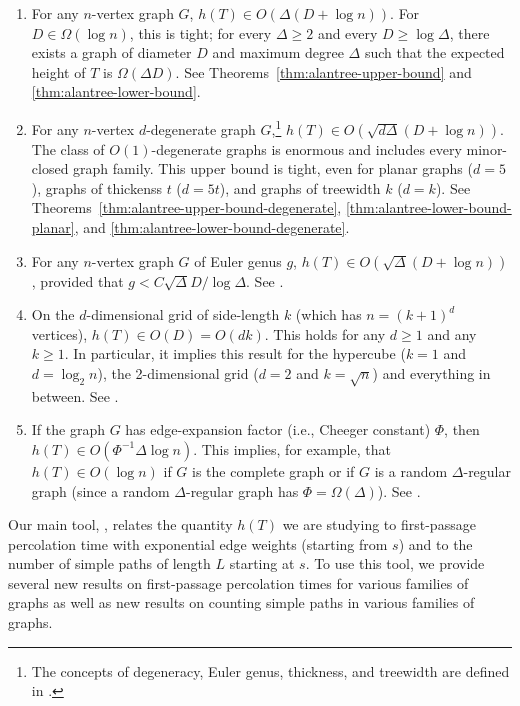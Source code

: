 \documentclass[lotsofwhite]{patmorin}
\begin{document}
\begin{enumerate}
  \item For any $n$-vertex graph $G$, $h(T)\in O(\Delta(D+\log n))$.
  For $D\in \Omega(\log n)$, this is tight; for every $\Delta\ge 2$
  and every $D \ge \log\Delta$, there exists a graph of diameter $D$
  and maximum degree $\Delta$ such that the expected height of $T$
  is $\Omega(\Delta D)$.  See Theorems~\ref{thm:alantree-upper-bound}
  and \ref{thm:alantree-lower-bound}.

  \item For any $n$-vertex $d$-degenerate graph $G$,\footnote{The
  concepts of degeneracy, Euler genus, thickness, and treewidth
  are defined in .} $h(T)\in
  O(\sqrt{d\Delta}(D+\log n))$.  The class of $O(1)$-degenerate
  graphs is enormous and includes every minor-closed graph family.
  This upper bound is tight, even for planar graphs ($d=5$), graphs
  of thickenss $t$ ($d=5t$), and graphs of treewidth $k$ ($d=k$).
  See Theorems~\ref{thm:alantree-upper-bound-degenerate},
  \ref{thm:alantree-lower-bound-planar}, and
  \ref{thm:alantree-lower-bound-degenerate}.

  \item For any $n$-vertex graph $G$ of Euler genus $g$,
  $h(T)\in O(\sqrt{\Delta}(D+\log n))$, provided that $g <
  C\sqrt{\Delta}D/\log\Delta$.  See .

  \item On the $d$-dimensional grid of side-length $k$ (which has
  $n=(k+1)^d$ vertices), $h(T)\in O(D)=O(dk)$. This holds for any
  $d\ge 1$ and any $k\ge 1$.  In particular, it implies this result
  for the hypercube ($k=1$ and $d=\log_2 n$), the 2-dimensional
  grid ($d=2$ and $k=\sqrt{n}$) and everything in between.
  See .

  \item If the graph $G$ has edge-expansion factor (i.e., Cheeger
  constant) $\Phi$, then $h(T)\in O(\Phi^{-1}\Delta\log n)$.
  This implies, for example, that $h(T)\in O(\log n)$ if $G$ is
  the complete graph or if $G$ is a random $\Delta$-regular graph
  (since a random $\Delta$-regular graph has $\Phi=\Omega(\Delta)$).
  See .
\end{enumerate}

Our main tool, , relates the quantity $h(T)$ we are
studying to first-passage percolation time with exponential edge weights
(starting from $s$) and to the number of simple paths of length $L$
starting at $s$.  To use this tool, we provide several new results on
first-passage percolation times for various families of graphs as well
as new results on counting simple paths in various families of graphs.
\end{document}
